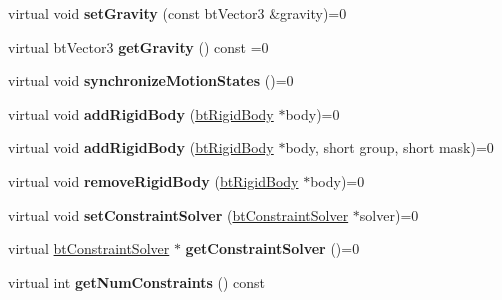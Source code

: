 \begin{DoxyCompactItemize}
\item 
\hypertarget{classbt_dynamics_world_aee63562f8067022cca1b4999057c4373}{virtual void {\bfseries set\+Gravity} (const bt\+Vector3 \&gravity)=0}\label{classbt_dynamics_world_aee63562f8067022cca1b4999057c4373}

\item 
\hypertarget{classbt_dynamics_world_a2a1de7e4e5456428d4558be6f24723ef}{virtual bt\+Vector3 {\bfseries get\+Gravity} () const =0}\label{classbt_dynamics_world_a2a1de7e4e5456428d4558be6f24723ef}

\item 
\hypertarget{classbt_dynamics_world_aed92a7b6bc477b60d50988a048eaa5a6}{virtual void {\bfseries synchronize\+Motion\+States} ()=0}\label{classbt_dynamics_world_aed92a7b6bc477b60d50988a048eaa5a6}

\item 
\hypertarget{classbt_dynamics_world_a8d8f03c04ba63f525e09cb95452687f0}{virtual void {\bfseries add\+Rigid\+Body} (\hyperlink{classbt_rigid_body}{bt\+Rigid\+Body} $\ast$body)=0}\label{classbt_dynamics_world_a8d8f03c04ba63f525e09cb95452687f0}

\item 
\hypertarget{classbt_dynamics_world_ac516f56dd52fc5d5575bb863ead1ad04}{virtual void {\bfseries add\+Rigid\+Body} (\hyperlink{classbt_rigid_body}{bt\+Rigid\+Body} $\ast$body, short group, short mask)=0}\label{classbt_dynamics_world_ac516f56dd52fc5d5575bb863ead1ad04}

\item 
\hypertarget{classbt_dynamics_world_a06ac55453d839d0a6cbc9c53e5537f73}{virtual void {\bfseries remove\+Rigid\+Body} (\hyperlink{classbt_rigid_body}{bt\+Rigid\+Body} $\ast$body)=0}\label{classbt_dynamics_world_a06ac55453d839d0a6cbc9c53e5537f73}

\item 
\hypertarget{classbt_dynamics_world_a65cd45eeb235a87516f4f22383ceac49}{virtual void {\bfseries set\+Constraint\+Solver} (\hyperlink{classbt_constraint_solver}{bt\+Constraint\+Solver} $\ast$solver)=0}\label{classbt_dynamics_world_a65cd45eeb235a87516f4f22383ceac49}

\item 
\hypertarget{classbt_dynamics_world_af6179dea87b148971a2fed3c14ff052b}{virtual \hyperlink{classbt_constraint_solver}{bt\+Constraint\+Solver} $\ast$ {\bfseries get\+Constraint\+Solver} ()=0}\label{classbt_dynamics_world_af6179dea87b148971a2fed3c14ff052b}

\item 
\hypertarget{classbt_dynamics_world_a3db884cabbdd509a522f7900393338e4}{virtual int {\bfseries get\+Num\+Constraints} () const }\label{classbt_dynamics_world_a3db884cabbdd509a522f7900393338e4}


\end{DoxyCompactItemize}
